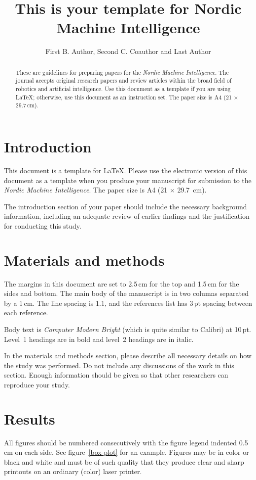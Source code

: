 \documentclass{elbioimp2}
\title{This is your template for Nordic Machine Intelligence}
\author{First B. Author\affiliation{Department, University, City,
    Country}, Second C. Coauthor\affiliation{Company, City,
    Country} and Last Author\affiliation{E-mail any correspondence to:
  myname@domain.com}}
\begin{document}
\maketitle

\begin{abstract}
  These are guidelines for preparing papers for the \emph{Nordic Machine Intelligence}. The journal accepts original research
  papers and review articles within the broad field of robotics and artificial intelligence. Use this document as a template if you are using
  \LaTeX; otherwise, use this document as an
  instruction set. The paper size is A4 (21 × 29.7\,cm).  

\end{abstract}

\section{Introduction}
This document is a template for \LaTeX. 
Please use the electronic version of this document as a
template when you produce your manuscript for submission to the
\emph{Nordic Machine Intelligence}. The paper size is A4 (21 × 
29.7~cm).

The introduction section of your paper should include the necessary
background information, including an adequate review of earlier
findings and the justification for conducting this study.

\section{Materials and methods}
The margins in this document are set to 2.5\,cm for the top and 1.5\,cm
for the sides and bottom. The main body of the manuscript is in two
columns separated by a 1\,cm. The line spacing is 1.1, and the
references list has 3\,pt spacing between each reference.

Body text is \emph{Computer Modern Bright} (which is quite similar to
Calibri) at 10\,pt. Level~1 headings are in bold and level~2
headings are in italic.

In the materials and methods section, please describe all necessary
details on how the study was performed. Do not
include any discussions of the work in this section. Enough
information should be given so that other researchers can reproduce
your study.


\section{Results}
All figures should be numbered consecutively with the figure legend
indented 0.5\,cm on each side. See figure~\ref{box-plot} for an example.
Figures may be in color or black and white and must be of such quality
that they produce clear and sharp printouts on an ordinary (color)
laser printer.
\end{document}
